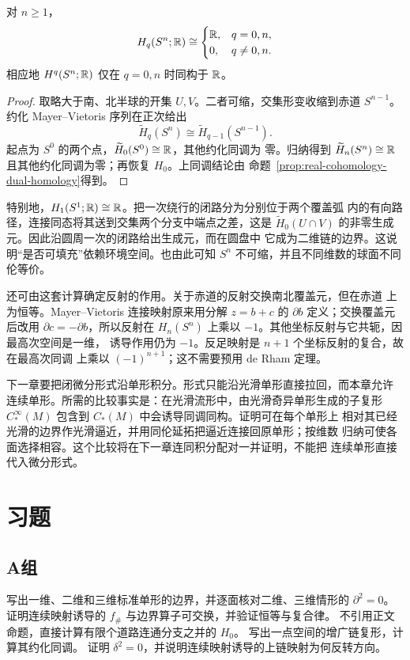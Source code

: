 \begin{theorem}\label{thm:homology-spheres-real}
对 $n\ge1$，
\[
 H_q(S^n;\mathbb{R})\cong
 \begin{cases}
 \mathbb{R},&q=0,n,\\
 0,&q\ne0,n.
 \end{cases}
\]
相应地 $H^q(S^n;\mathbb{R})$ 仅在 $q=0,n$ 时同构于 $\mathbb{R}$。
\end{theorem}
\begin{proof}
取略大于南、北半球的开集 $U,V$。二者可缩，交集形变收缩到赤道
$S^{n-1}$。约化 Mayer--Vietoris 序列在正次给出
\[
 \widetilde H_q(S^n)\cong\widetilde H_{q-1}(S^{n-1}).
\]
起点为 $S^0$ 的两个点，$\widetilde H_0(S^0)\cong\mathbb{R}$，其他约化同调为
零。归纳得到 $\widetilde H_n(S^n)\cong\mathbb{R}$ 且其他约化同调为零；再恢复
$H_0$。上同调结论由
命题~\ref{prop:real-cohomology-dual-homology}得到。
\end{proof}

特别地，$H_1(S^1;\mathbb{R})\cong\mathbb{R}$。把一次绕行的闭路分为分别位于两个覆盖弧
内的有向路径，连接同态将其送到交集两个分支中端点之差，这是
$\widetilde H_0(U\cap V)$ 的非零生成元。因此沿圆周一次的闭路给出生成元，而在圆盘中
它成为二维链的边界。这说明“是否可填充”依赖环境空间。也由此可知
$S^n$ 不可缩，并且不同维数的球面不同伦等价。

还可由这套计算确定反射的作用。关于赤道的反射交换南北覆盖元，但在赤道
上为恒等。Mayer--Vietoris 连接映射原来用分解 $z=b+c$ 的 $\partial b$
定义；交换覆盖元后改用 $\partial c=-\partial b$，所以反射在
$H_n(S^n)$ 上乘以 $-1$。其他坐标反射与它共轭，因最高次空间是一维，
诱导作用仍为 $-1$。反足映射是 $n+1$ 个坐标反射的复合，故在最高次同调
上乘以 $(-1)^{n+1}$；这不需要预用 de Rham 定理。

下一章要把闭微分形式沿单形积分。形式只能沿光滑单形直接拉回，而本章允许
连续单形。所需的比较事实是：在光滑流形中，由光滑奇异单形生成的子复形
$C_*^\infty(M)$ 包含到 $C_*(M)$ 中会诱导同调同构。证明可在每个单形上
相对其已经光滑的边界作光滑逼近，并用同伦延拓把逼近连接回原单形；按维数
归纳可使各面选择相容。这个比较将在下一章连同积分配对一并证明，不能把
连续单形直接代入微分形式。

\section*{习题}
\subsection*{A组}
\begin{enumerate}[label=\textbf{\thechapter.\arabic*.}]
写出一维、二维和三维标准单形的边界，并逐面核对二维、三维情形的 $\partial^2=0$。
证明连续映射诱导的 $f_\#$ 与边界算子可交换，并验证恒等与复合律。
不引用正文命题，直接计算有限个道路连通分支之并的 $H_0$。
写出一点空间的增广链复形，计算其约化同调。
证明 $\delta^2=0$，并说明连续映射诱导的上链映射为何反转方向。
\end{enumerate}
